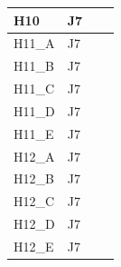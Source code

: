 \begin{longtable}{|l|l|l|l|}
H10                           & J7                                                &                                                  &                                                  \\ \hline
H11\_A                           & J7                                                &                                                  &                                                  \\ \hline
H11\_B                           & J7                                                &                                                  &                                                  \\ \hline
H11\_C                           & J7                                                &                                                  &                                                  \\ \hline
H11\_D                           & J7                                                &                                                  &                                                  \\ \hline
H11\_E                           & J7                                                &                                                  &                                                  \\ \hline
H12\_A                           & J7                                                &                                                  &                                                  \\ \hline
H12\_B                           & J7                                                &                                                  &                                                  \\ \hline
H12\_C                           & J7                                                &                                                  &                                                  \\ \hline
H12\_D                           & J7                                                &                                                  &                                                  \\ \hline
H12\_E                           & J7                                                &                                                  &                                                  \\ \hline

\end{longtable}
